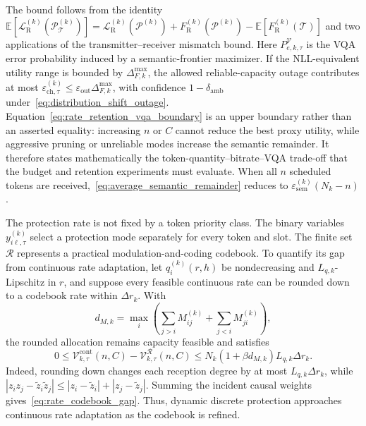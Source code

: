 \documentclass[journal]{IEEEtran}
\begin{document}
The bound follows from the identity $\mathbb E[\mathcal L_{\mathrm R}^{(k)}(\mathcal P_{\mathcal T}^{(k)})]=\mathcal L_{\mathrm R}^{(k)}(\mathcal P^{(k)})+F_{\mathrm R}^{(k)}(\mathcal P^{(k)})-\mathbb E[F_{\mathrm R}^{(k)}(\mathcal T)]$ and two applications of the transmitter--receiver mismatch bound. Here $P_{e,k,\tau}^{\mathcal V}$ is the VQA error probability induced by a semantic-frontier maximizer. If the NLL-equivalent utility range is bounded by $\Delta_{F,k}^{\max}$, the allowed reliable-capacity outage contributes at most $\varepsilon_{\mathrm{ch},\tau}^{(k)}\leq\varepsilon_{\mathrm{out}}\Delta_{F,k}^{\max}$, with confidence $1-\delta_{\mathrm{amb}}$ under~\eqref{eq:distribution_shift_outage}. Equation~\eqref{eq:rate_retention_vqa_boundary} is an upper boundary rather than an asserted equality: increasing $n$ or $C$ cannot reduce the best proxy utility, while aggressive pruning or unreliable modes increase the semantic remainder. It therefore states mathematically the token-quantity--bitrate--VQA trade-off that the budget and retention experiments must evaluate. When all $n$ scheduled tokens are received,~\eqref{eq:average_semantic_remainder} reduces to $\varepsilon_{\mathrm{sem}}^{(k)}(N_k-n)$.

The protection rate is not fixed by a token priority class. The binary variables $y_{i\ell,\tau}^{(k)}$ select a protection mode separately for every token and slot. The finite set $\mathcal R$ represents a practical modulation-and-coding codebook. To quantify its gap from continuous rate adaptation, let $q_i^{(k)}(r,h)$ be nondecreasing and $L_{q,k}$-Lipschitz in $r$, and suppose every feasible continuous rate can be rounded down to a codebook rate within $\Delta r_k$. With
\begin{equation}
d_{M,k}=\max_i\left(
\sum_{j>i}M_{ij}^{(k)}+\sum_{j<i}M_{ji}^{(k)}
\right),
\label{eq:directed_coupling_degree}
\end{equation}
the rounded allocation remains capacity feasible and satisfies
\begin{equation}
0\leq\mathcal V_{k,\tau}^{\mathrm{cont}}(n,C)
-\mathcal V_{k,\tau}^{\mathcal R}(n,C)
\leq N_k(1+\beta d_{M,k})L_{q,k}\Delta r_k.
\label{eq:rate_codebook_gap}
\end{equation}
Indeed, rounding down changes each reception degree by at most $L_{q,k}\Delta r_k$, while $|z_iz_j-\widetilde z_i\widetilde z_j|\leq|z_i-\widetilde z_i|+|z_j-\widetilde z_j|$. Summing the incident causal weights gives~\eqref{eq:rate_codebook_gap}. Thus, dynamic discrete protection approaches continuous rate adaptation as the codebook is refined.
\end{document}
